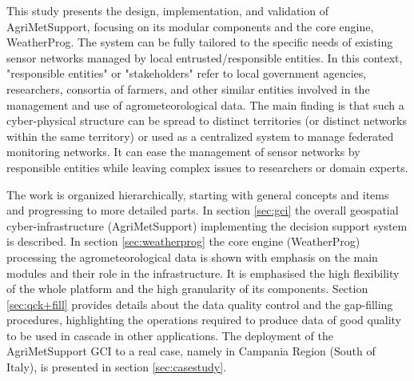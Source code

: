 \documentclass[authoryear,preprint,review,12pt]{elsarticle}
\newcommand{\note}[1]{\emph{\textcolor{red}{#1}}}
\begin{document}
This study presents the design, implementation, and validation of AgriMetSupport, focusing on its modular components and the core engine, WeatherProg.
The system can be fully tailored to the specific needs of existing sensor networks %
managed by local entrusted/responsible entities.
In this context, "responsible entities" or "stakeholders" refer to local government agencies, researchers, consortia of farmers, and other similar entities involved in the management and use of agrometeorological data.
The main finding is that such a cyber-physical structure can be spread to distinct territories (or distinct networks within the same territory) or used as a centralized system to manage federated monitoring networks.
It can ease the management of sensor networks by responsible entities while leaving complex issues to researchers or domain experts.



The work is organized hierarchically, starting with general concepts and items and progressing to more detailed parts.
In section \ref{sec:gci} the overall geospatial cyber-infrastructure (AgriMetSupport) implementing the decision support system is described.
In section \ref{sec:weatherprog} the core engine (WeatherProg) processing the agrometeorological data is shown with emphasis on the main modules and their role in the infrastructure.
It is emphasised the high flexibility of the whole platform and the high granularity of its components.
Section \ref{sec:qck+fill} provides details about the data quality control and the gap-filling procedures, highlighting the operations required to produce data of good quality to be used in cascade in other 
applications.
The deployment of the AgriMetSupport GCI to a real case, namely in Campania Region (South of Italy), is presented in section \ref{sec:casestudy}.
\end{document}
